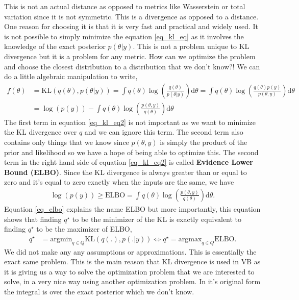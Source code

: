 \documentclass[10pt ]{article}
\begin{document}
This is not an actual distance as opposed to metrics like Wasserstein or total variation since it is not symmetric. This is a divergence as opposed to a distance. One reason for choosing it is that it is very fast and practical and widely used.  It is not possible to simply minimize the equation \eqref{eq_kl_eq} as it involves the knowledge of the exact posterior $p(\theta | y)$. This is not a problem unique to KL divergence but it is a problem for any metric. How can we optimize the problem and choose the closest distribution to a distribution that we don't know?!  We can do a little algebraic manipulation to write, 
\begin{align}
f(\theta) &= \mathrm{KL}(q(\theta), p(\theta|y)) = \int q(\theta) \log \left(\frac{q(\theta) }{p(\theta | y)} \right) \mathrm{d}\theta = \int q(\theta) \log \left(\frac{q(\theta) p(y)}{p(\theta , y)} \right) \mathrm{d}\theta \nonumber \\
&= \log(p(y)) - \int q(\theta) \log \left(\frac{p(\theta , y)}{q(\theta)} \right) \mathrm{d}\theta
\label{eq_kl_eq2}
\end{align}
The first term in equation \eqref{eq_kl_eq2} is not important as we want to minimize the KL divergence over $q$ and we can ignore this term. The second term also contains only things that we know since $p(\theta, y)$ is simply the product of the prior and likelihood so we have a hope of being able to optimize this. The second term in the right hand side of equation \eqref{eq_kl_eq2} is called \textbf{Evidence Lower Bound (ELBO)}. Since the KL divergence is always greater than or equal to zero and it's equal to zero exactly when the inputs are the same, we have 
\begin{align}
\log(p(y)) \ge \mathrm{ELBO} =  \int q(\theta) \log \left(\frac{p(\theta , y)}{q(\theta)} \right) \mathrm{d}\theta.
\label{eq_elbo}
\end{align}
Equation \eqref{eq_elbo} explains the name ELBO but more importantly, this equation shows that finding $q^{\star}$ to be the minimizer of the KL is exactly equivalent to finding $q^{\star}$ to be the maximizer of ELBO, 
\begin{align}
q^{\star} &= \mathrm{argmin}_{q \in Q} \mathrm{KL}(q(.), p(.|y))  \Leftrightarrow q^{\star} = \mathrm{argmax}_{q \in Q}  \mathrm{ELBO}.
\label{eq_elbo_equivalence}
\end{align}
We did not make any any assumptions or approximations. This is essentially the exact same problem. This is the main reason that KL divergence is used in VB as it is giving us a way to solve the optimization problem that we are interested to solve, in a very nice way using another optimization problem. In it's original form the integral is over the exact posterior which we don't know. 
\end{document}
